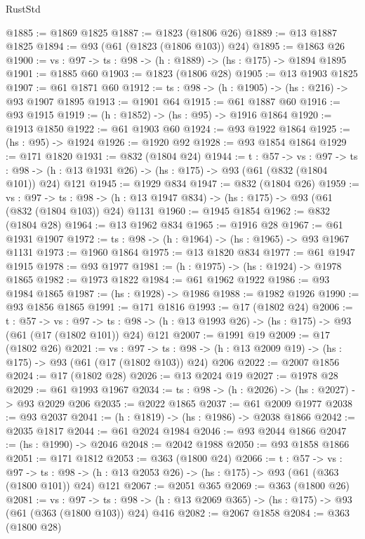 \begin{lexlean}{RustStd}
\begin{coremodule}
@1885 := @1869 @1825
@1887 := @1823 (@1806 @26)
@1889 := @13 @1887 @1825
@1894 := @93 (@61 (@1823 (@1806 @103)) @24)
@1895 := @1863 @26
@1900 := {vs : @97} -> {ts : @98} -> (h : @1889) -> (hs : @175) -> @1894 @1895
@1901 := @1885 @60
@1903 := @1823 (@1806 @28)
@1905 := @13 @1903 @1825
@1907 := @61 @1871 @60
@1912 := {ts : @98} -> (h : @1905) -> (hs : @216) -> @93 @1907 @1895
@1913 := @1901 @64
@1915 := @61 @1887 @60
@1916 := @93 @1915
@1919 := (h : @1852) -> (hs : @95) -> @1916 @1864
@1920 := @1913 @1850
@1922 := @61 @1903 @60
@1924 := @93 @1922 @1864
@1925 := (hs : @95) -> @1924
@1926 := @1920 @92
@1928 := @93 @1854 @1864
@1929 := @171 @1820
@1931 := @832 (@1804 @24)
@1944 := {t : @57} ->
  {vs : @97} ->
  {ts : @98} -> (h : @13 @1931 @26) -> (hs : @175) -> @93 (@61 (@832 (@1804 @101)) @24) @121
@1945 := @1929 @834
@1947 := @832 (@1804 @26)
@1959 := {vs : @97} ->
  {ts : @98} -> (h : @13 @1947 @834) -> (hs : @175) -> @93 (@61 (@832 (@1804 @103)) @24) @1131
@1960 := @1945 @1854
@1962 := @832 (@1804 @28)
@1964 := @13 @1962 @834
@1965 := @1916 @28
@1967 := @61 @1931 @1907
@1972 := {ts : @98} -> (h : @1964) -> (hs : @1965) -> @93 @1967 @1131
@1973 := @1960 @1864
@1975 := @13 @1820 @834
@1977 := @61 @1947 @1915
@1978 := @93 @1977
@1981 := (h : @1975) -> (hs : @1924) -> @1978 @1865
@1982 := @1973 @1822
@1984 := @61 @1962 @1922
@1986 := @93 @1984 @1865
@1987 := (hs : @1928) -> @1986
@1988 := @1982 @1926
@1990 := @93 @1856 @1865
@1991 := @171 @1816
@1993 := @17 (@1802 @24)
@2006 := {t : @57} ->
  {vs : @97} ->
  {ts : @98} -> (h : @13 @1993 @26) -> (hs : @175) -> @93 (@61 (@17 (@1802 @101)) @24) @121
@2007 := @1991 @19
@2009 := @17 (@1802 @26)
@2021 := {vs : @97} ->
  {ts : @98} -> (h : @13 @2009 @19) -> (hs : @175) -> @93 (@61 (@17 (@1802 @103)) @24) @206
@2022 := @2007 @1856
@2024 := @17 (@1802 @28)
@2026 := @13 @2024 @19
@2027 := @1978 @28
@2029 := @61 @1993 @1967
@2034 := {ts : @98} -> (h : @2026) -> (hs : @2027) -> @93 @2029 @206
@2035 := @2022 @1865
@2037 := @61 @2009 @1977
@2038 := @93 @2037
@2041 := (h : @1819) -> (hs : @1986) -> @2038 @1866
@2042 := @2035 @1817
@2044 := @61 @2024 @1984
@2046 := @93 @2044 @1866
@2047 := (hs : @1990) -> @2046
@2048 := @2042 @1988
@2050 := @93 @1858 @1866
@2051 := @171 @1812
@2053 := @363 (@1800 @24)
@2066 := {t : @57} ->
  {vs : @97} ->
  {ts : @98} -> (h : @13 @2053 @26) -> (hs : @175) -> @93 (@61 (@363 (@1800 @101)) @24) @121
@2067 := @2051 @365
@2069 := @363 (@1800 @26)
@2081 := {vs : @97} ->
  {ts : @98} -> (h : @13 @2069 @365) -> (hs : @175) -> @93 (@61 (@363 (@1800 @103)) @24) @416
@2082 := @2067 @1858
@2084 := @363 (@1800 @28)

\end{coremodule}
\end{lexlean}
